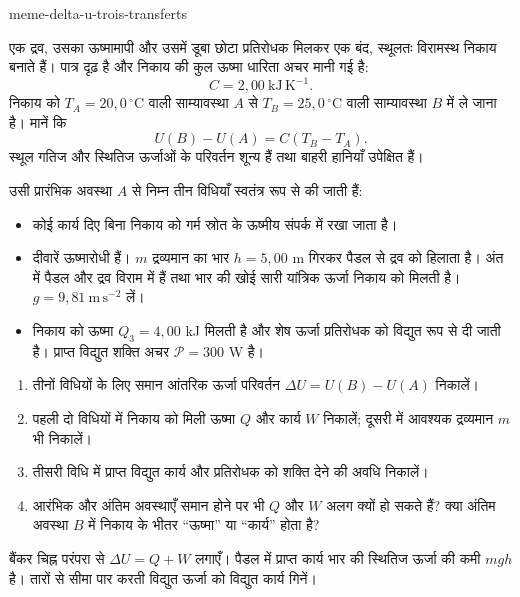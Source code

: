 \begin{exo}[आंतरिक ऊर्जा का समान परिवर्तन, अंतरण के तीन ढंग]{meme-delta-u-trois-transferts}

एक द्रव, उसका ऊष्मामापी और उसमें डूबा छोटा प्रतिरोधक मिलकर एक बंद, स्थूलतः विरामस्थ निकाय बनाते हैं।
पात्र दृढ़ है और निकाय की कुल ऊष्मा धारिता अचर मानी गई है:
\[
C=2{,}00\ \mathrm{kJ\,K^{-1}}.
\]
निकाय को $T_A=20{,}0\,^\circ\mathrm{C}$ वाली साम्यावस्था $A$ से
$T_B=25{,}0\,^\circ\mathrm{C}$ वाली साम्यावस्था $B$ में ले जाना है। मानें कि
\[
U(B)-U(A)=C(T_B-T_A).
\]
स्थूल गतिज और स्थितिज ऊर्जाओं के परिवर्तन शून्य हैं तथा बाहरी हानियाँ उपेक्षित हैं।

उसी प्रारंभिक अवस्था $A$ से निम्न तीन विधियाँ स्वतंत्र रूप से की जाती हैं:
\begin{itemize}
\item[विधि 1] कोई कार्य दिए बिना निकाय को गर्म स्रोत के ऊष्मीय संपर्क में रखा जाता है।
\item[विधि 2] दीवारें ऊष्मारोधी हैं। $m$ द्रव्यमान का भार $h=5{,}00$ m गिरकर पैडल से द्रव को हिलाता है। अंत में पैडल और द्रव विराम में हैं तथा भार की खोई सारी यांत्रिक ऊर्जा निकाय को मिलती है। $g=9{,}81\ \mathrm{m\,s^{-2}}$ लें।
\item[विधि 3] निकाय को ऊष्मा $Q_3=4{,}00$ kJ मिलती है और शेष ऊर्जा प्रतिरोधक को विद्युत रूप से दी जाती है। प्राप्त विद्युत शक्ति अचर $\mathcal P=300$ W है।
\end{itemize}

\begin{enumerate}
\item तीनों विधियों के लिए समान आंतरिक ऊर्जा परिवर्तन $\Delta U=U(B)-U(A)$ निकालें।
\item पहली दो विधियों में निकाय को मिली ऊष्मा $Q$ और कार्य $W$ निकालें; दूसरी में आवश्यक द्रव्यमान $m$ भी निकालें।
\item तीसरी विधि में प्राप्त विद्युत कार्य और प्रतिरोधक को शक्ति देने की अवधि निकालें।
\item आरंभिक और अंतिम अवस्थाएँ समान होने पर भी $Q$ और $W$ अलग क्यों हो सकते हैं? क्या अंतिम अवस्था $B$ में निकाय के भीतर “ऊष्मा” या “कार्य” होता है?
\end{enumerate}

\begin{indication}
बैंकर चिह्न परंपरा से $\Delta U=Q+W$ लगाएँ। पैडल में प्राप्त कार्य भार की स्थितिज ऊर्जा की कमी $mgh$ है। तारों से सीमा पार करती विद्युत ऊर्जा को विद्युत कार्य गिनें।
\end{indication}


\end{exo}
